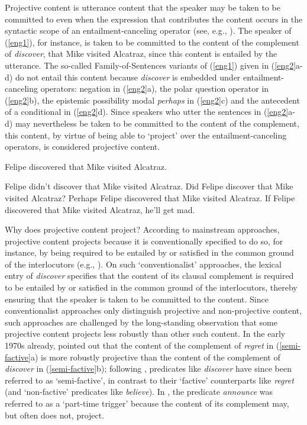\documentclass[11pt,fleqn]{article}
\newcommand{\6}{\mbox{$[\hspace*{-.6mm}[$}}
\newcommand{\9}{\mbox{$]\hspace*{-.6mm}]$}}
\begin{document}
Projective content is utterance content that the speaker may be taken to be committed to even when the expression that contributes the content occurs in the syntactic scope of an entailment-canceling operator (see, e.g., \citealt{ccmg90}). The speaker of (\ref{eng1}), for instance, is taken to be committed to the content of the complement of {\em discover}, that Mike visited Alcatraz, since this content is entailed by the utterance. The so-called Family-of-Sentences variants of (\ref{eng1}) given in (\ref{eng2}a-d) do not entail this content because {\em discover} is embedded under entailment-canceling operators: negation in (\ref{eng2}a), the polar question operator in (\ref{eng2}b), the epistemic possibility modal {\em perhaps} in (\ref{eng2}c) and the antecedent of a conditional in (\ref{eng2}d). Since speakers who utter the sentences in (\ref{eng2}a-d) may nevertheless be taken to be committed to the content of the complement, this content, by virtue of being able to `project' over the entailment-canceling operators, is considered projective content. 

\begin{exe}
\ex\label{eng1}  Felipe discovered that Mike visited Alcatraz.

\ex\label{eng2}
\begin{xlist} 
\ex Felipe didn't discover that Mike visited Alcatraz.
\ex Did Felipe discover that Mike visited Alcatraz?
\ex Perhaps Felipe discovered that Mike visited Alcatraz.
\ex If Felipe discovered that Mike visited Alcatraz, he'll get mad.
\end{xlist}
\end{exe}

Why does projective content project? According to mainstream approaches, projective content projects because it is conventionally specified to do so, for instance, by being required to be entailed by or satisfied in the common ground of the interlocutors (e.g., \citealt{heim83,vds92,geurts99}). On such `conventionalist' approaches, the lexical entry of {\em discover} specifies that the content of its clausal complement is required to be entailed by or satisfied in the common ground of the interlocutors, thereby ensuring that the speaker is taken to be committed to the content. Since conventionalist approaches only distinguish projective and non-projective content, such approaches are challenged by the long-standing observation that some projective content projects less robustly than other such content. In the early 1970s already, \citet{karttunen71b} pointed out that the content of the complement of {\em regret} in (\ref{semi-factive}a) is more robustly projective than the content of the complement of {\em discover} in (\ref{semi-factive}b); following \citealt{karttunen71b}, predicates like {\em discover} have since been referred to as `semi-factive', in contrast to their `factive' counterparts like {\em regret} (and `non-factive' predicates like {\em believe}). In \citealt{schlenker10}, the predicate {\em announce} was referred to as a `part-time trigger' because the content of its complement may, but often does not, project.
\end{document}
